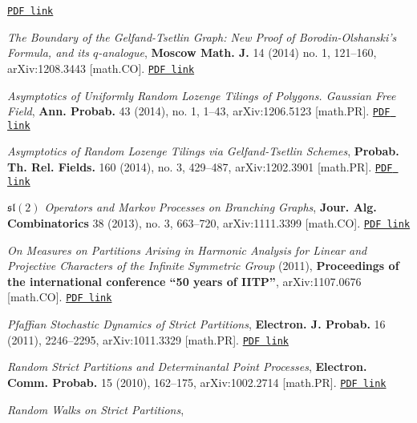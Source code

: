 \documentclass[letterpaper,11pt]{article}
\begin{document}
\begin{etaremune}
		\href{https://storage.lpetrov.cc/research_files/Petrov-publ/12-publ-petrov.pdf}{\texttt{PDF link}}
	\item
	      \emph{The Boundary of the Gelfand-Tsetlin Graph: New Proof of
		      Borodin-Olshanski's Formula, and its $q$-analogue},
					\textbf{Moscow Math. J.} 14 (2014) no. 1, 121--160,
	      arXiv:1208.3443 [math.CO].
		\href{https://storage.lpetrov.cc/research_files/Petrov-publ/11-publ-petrov.pdf}{\texttt{PDF link}}
	\item
	      \emph{Asymptotics of Uniformly Random Lozenge Tilings of
		      Polygons. Gaussian Free Field},
					\textbf{Ann. Probab.} 43 (2014), no. 1, 1--43, arXiv:1206.5123
	      [math.PR].
		\href{https://storage.lpetrov.cc/research_files/Petrov-publ/10-publ-petrov.pdf}{\texttt{PDF link}}
	\item
	      \emph{Asymptotics of Random Lozenge Tilings via Gelfand-Tsetlin
		      Schemes},
					\textbf{Probab. Th. Rel. Fields.} 160 (2014), no. 3,
	      429--487, arXiv:1202.3901 [math.PR].
		\href{https://storage.lpetrov.cc/research_files/Petrov-publ/09-publ-petrov.pdf}{\texttt{PDF link}}
	\item
	      \emph{$\mathfrak{sl}(2)$
		      Operators and Markov Processes on Branching Graphs},
					\textbf{Jour. Alg. Combinatorics} 38 (2013), no. 3, 663--720,
	      arXiv:1111.3399 [math.CO].
		\href{https://storage.lpetrov.cc/research_files/Petrov-publ/08-publ-petrov.pdf}{\texttt{PDF link}}
	\item
	      \emph{On Measures on Partitions Arising in Harmonic Analysis for
		      Linear and Projective Characters of the Infinite Symmetric Group} (2011),
	      \textbf{Proceedings of the international conference ``50 years of
				IITP''}, arXiv:1107.0676 [math.CO].
		\href{https://storage.lpetrov.cc/research_files/Petrov-publ/07-publ-petrov.pdf}{\texttt{PDF link}}
	\item
	      \emph{Pfaffian Stochastic Dynamics of Strict Partitions},
			\textbf{Electron. J. Probab.} 16 (2011), 2246--2295,
	      arXiv:1011.3329 [math.PR].
		\href{https://storage.lpetrov.cc/research_files/Petrov-publ/06-publ-petrov.pdf}{\texttt{PDF link}}
	\item
	      \emph{Random Strict Partitions and Determinantal Point
		      Processes},
					\textbf{Electron. Comm. Probab.} 15 (2010), 162--175,
	      arXiv:1002.2714 [math.PR].
		\href{https://storage.lpetrov.cc/research_files/Petrov-publ/05-publ-petrov.pdf}{\texttt{PDF link}}
	\item
	      \emph{Random Walks on Strict Partitions}, 

\end{etaremune}
\end{document}

